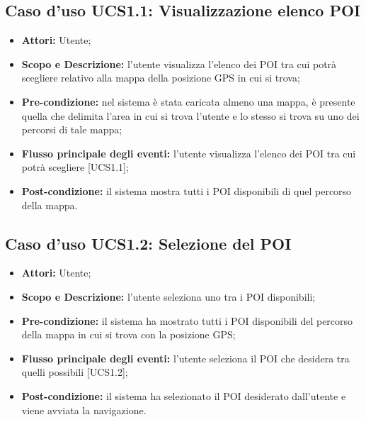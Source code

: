 \subsection{Caso d'uso UCS1.1: Visualizzazione elenco POI}
\begin{itemize}
\item \textbf{Attori:} Utente;
\item \textbf{Scopo e Descrizione:} l’utente visualizza l’elenco dei POI tra cui potrà scegliere relativo alla mappa della posizione GPS in cui si trova;
\item \textbf{Pre-condizione:} nel sistema è stata caricata almeno una mappa, è presente quella che delimita l'area in cui si trova l'utente e lo stesso si trova su uno dei percorsi di tale mappa;
\item \textbf{Flusso principale degli eventi:} l'utente visualizza l'elenco dei POI tra cui potrà scegliere [UCS1.1];
\item \textbf{Post-condizione:} il sistema mostra tutti i POI disponibili di quel percorso della mappa. 
\end{itemize}

\subsection{Caso d'uso UCS1.2: Selezione del POI}
\begin{itemize}
\item \textbf{Attori:} Utente;
\item \textbf{Scopo e Descrizione:} l'utente seleziona uno tra i POI disponibili;
\item \textbf{Pre-condizione:} il sistema ha mostrato tutti i POI disponibili del percorso della mappa in cui si trova con la posizione GPS;
\item \textbf{Flusso principale degli eventi:} l'utente seleziona il POI che desidera tra quelli possibili [UCS1.2]; 
\item \textbf{Post-condizione:} il sistema ha selezionato il POI desiderato dall'utente e viene avviata la navigazione.
\end{itemize}

